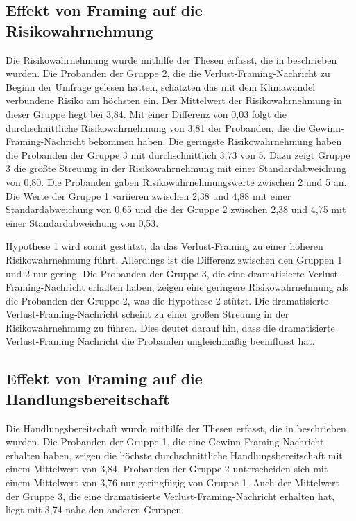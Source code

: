 \documentclass[
	12pt, %
	a4paper,
	listof=totoc, %
  bibliography=totoc, %
	numbers=noenddot, %
	german, %
	headsepline, %
	oneside %
	]{scrbook} %
\begin{document}
\subsection{Effekt von Framing auf die Risikowahrnehmung}\label{sec:framing_risk}
Die Risikowahrnehmung wurde mithilfe der Thesen erfasst, die in  beschrieben wurden. Die Probanden der Gruppe 2, die die Verlust-Framing-Nachricht zu Beginn der Umfrage gelesen hatten, schätzten das mit dem Klimawandel verbundene Risiko am höchsten ein. Der Mittelwert der Risikowahrnehmung in dieser Gruppe liegt bei 3,84. Mit einer Differenz von 0,03 folgt die durchschnittliche Risikowahrnehmung von 3,81 der Probanden, die die Gewinn-Framing-Nachricht bekommen haben. Die geringste Risikowahrnehmung haben die Probanden der Gruppe 3 mit durchschnittlich 3,73 von 5. Dazu zeigt Gruppe 3 die größte Streuung in der Risikowahrnehmung mit einer Standardabweichung von 0,80. Die Probanden gaben Risikowahrnehmungswerte zwischen 2 und 5 an. Die Werte der Gruppe 1 variieren zwischen 2,38 und 4,88 mit einer Standardabweichung von 0,65 und die der Gruppe 2 zwischen 2,38 und 4,75 mit einer Standardabweichung von 0,53.

Hypothese 1 wird somit gestützt, da das Verlust-Framing zu einer höheren Risikowahrnehmung führt. Allerdings ist die Differenz zwischen den Gruppen 1 und 2 nur gering. Die Probanden der Gruppe 3, die eine dramatisierte Verlust-Framing-Nachricht erhalten haben, zeigen eine geringere Risikowahrnehmung als die Probanden der Gruppe 2, was die Hypothese 2 stützt. Die dramatisierte Verlust-Framing-Nachricht scheint zu einer großen Streuung in der Risikowahrnehmung zu führen. Dies deutet darauf hin, dass die dramatisierte Verlust-Framing Nachricht die Probanden ungleichmäßig beeinflusst hat.

\subsection{Effekt von Framing auf die Handlungsbereitschaft}\label{sec:framing_action}
Die Handlungsbereitschaft wurde mithilfe der Thesen erfasst, die in  beschrieben wurden. Die Probanden der Gruppe 1, die eine Gewinn-Framing-Nachricht erhalten haben, zeigen die höchste durchschnittliche Handlungsbereitschaft mit einem Mittelwert von 3,84. Probanden der Gruppe 2 unterscheiden sich mit einem Mittelwert von 3,76 nur geringfügig von Gruppe 1. Auch der Mittelwert der Gruppe 3, die eine dramatisierte Verlust-Framing-Nachricht erhalten hat, liegt mit 3,74 nahe den anderen Gruppen.
\end{document}
